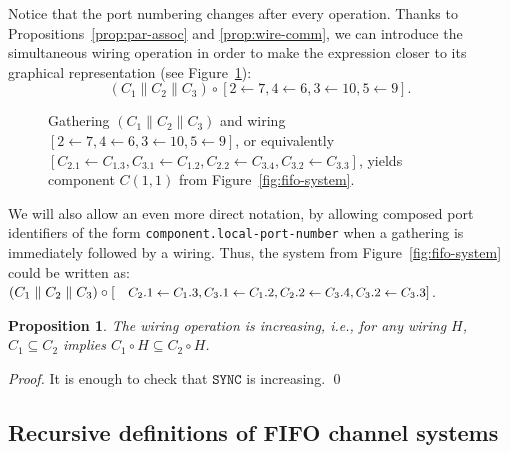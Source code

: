 \documentclass{llncs}
\newtheorem{prop}[thm]{Proposition}
\newcommand{\out}[1]{}
\begin{document}
Notice that the port numbering changes after every operation. Thanks
to Propositions~\ref{prop:par-assoc} and \ref{prop:wire-comm}, we can
introduce the simultaneous wiring operation in order to make the
expression closer to its graphical representation (see
Figure~\ref{fig:fifo-system-2}):
\[
(C_1\parallel C_2\parallel C_3) 
\circ [2\leftarrow 7, 4\leftarrow 6,
3\leftarrow 10, 5\leftarrow 9].
\]
%
\begin{figure}[htb]
  \centering
  
  \caption{Gathering $(C_1\parallel C_2\parallel C_3)$ and wiring
    {\scriptsize $[2\leftarrow 7, 4\leftarrow 6, 3\leftarrow 10,
      5\leftarrow 9]$}, or equivalently {\scriptsize $[C_2.1\leftarrow
        C_1.3, C_3.1\leftarrow C_1.2, C_2.2\leftarrow C_3.4,
        C_3.2\leftarrow C_3.3]$}, yields component $C(1,1)$ from
    Figure~\ref{fig:fifo-system}.}
  \label{fig:fifo-system-2}
\end{figure}
%
We will also allow an even more direct notation, by allowing composed
port identifiers of the form \texttt{component.local-port-number} when
a gathering is immediately followed by a wiring. Thus, the system from
Figure~\ref{fig:fifo-system} could be written as:
$(C_1\parallel C_2\parallel C_3) 
\circ [\mbox{\footnotesize $C_2.1\leftarrow C_1.3, C_3.1\leftarrow C_1.2,
C_2.2\leftarrow C_3.4, C_3.2\leftarrow C_3.3$}]$.

\out{ That last notation allows us to write the following equation:
  \[((C_1 \parallel C_2)\circ [H_1,\ldots, H_k] ) \parallel C_3 =
  (C_1 \parallel C_2 \parallel C_3) \circ [H_1,\ldots, H_k],
  \]
  whereas in fact we should have written  
  \[((C_1 \parallel C_2)\circ [H_1,\ldots, H_k] ) \parallel C_3 =
  (C_1 \parallel C_2 \parallel C_3) \circ [\tilde{H_1},\ldots, \tilde{H_k}],
  \]
  since the port positions are changing after every grouping; by
  $\tilde{H}$ we mean the wiring $H$ with the appropriate renumbering of
  the corresponding ports.
}



\begin{prop}\label{prop:wire-increasing} 
  The wiring operation is increasing, i.e., for any wiring $H$,
  $C_1\subseteq C_2$ implies $C_1\circ H \subseteq C_2\circ H$.
\end{prop}
\begin{proof} 
  It is enough to check that $\mathtt{SYNC}$ is increasing. \qed
\end{proof}

\subsection{Recursive definitions of FIFO channel systems}
\end{document}
